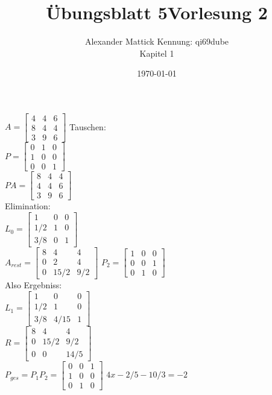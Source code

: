 \documentclass{article}
\title{Übungsblatt 5}
\author{
Alexander Mattick Kennung: qi69dube\\
Kapitel 1
}
\date{\today}
\title{Vorlesung 2}
\begin{document}
	\maketitle
	$A = {\begin{bmatrix} 
	4 & 4 & 6 \\
	8 & 4 & 4 \\
	3 & 9 & 6 \end{bmatrix}}$
	Tauschen:\\
	$P = \begin{bmatrix}
	0&1&0\\
	1&0&0\\
	0&0&1
	\end{bmatrix}
	$\\
	$PA = \begin{bmatrix} 
	8 & 4 & 4 \\
	4 & 4 & 6 \\
	3 & 9 & 6
	 \end{bmatrix}$\\
	Elimination:\\
	$L_0=
	\begin{bmatrix} 
	1    & 0 & 0 \\
	1/2  & 1 & 0 \\
	3/8  & 0 & 1
	 \end{bmatrix} $\\	
	$A_{rest} = 
	\begin{bmatrix} 
	8 & 4   & 4 \\
	0 & 2   & 4 \\
	0 & 15/2 & 9/2
	 \end{bmatrix}$
	$P_2 = \begin{bmatrix}
	1&0&0\\
	0&0&1\\
	0&1&0
	\end{bmatrix}
	$\\
	Also Ergebniss:\\
	$L_1=
	\begin{bmatrix} 
	1     & 0 & 0 \\
	1/2  & 1 & 0 \\
	3/8 & 4/15 & 1
	 \end{bmatrix}$\\
	$R = \begin{bmatrix} 
	8 & 4   & 4 \\
	0 & 15/2 & 9/2\\
	0 & 0   & 14/5	
	 \end{bmatrix}$\\
	$P_{ges} = P_1 P_2 = \begin{bmatrix}
	0&0&1\\
	1&0&0\\
	0&1&0\end{bmatrix}
	$
	$4x-2/5-10/3=-2$
\end{document}
